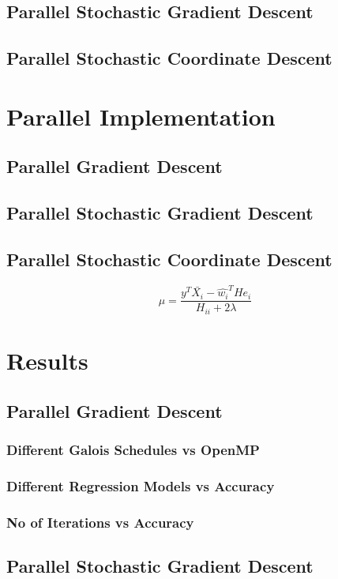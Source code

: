 \documentclass{sigplanconf}
\begin{document}
\subsection{Parallel Stochastic Gradient Descent}
\subsection{Parallel Stochastic Coordinate Descent}

\section{Parallel Implementation}
\subsection{Parallel Gradient Descent}
\subsection{Parallel Stochastic Gradient Descent}
\subsection{Parallel Stochastic Coordinate Descent}
\begin{equation} \mu = \frac{y^T \bar{X_i} - \widehat{w_i}^T H e_i }{H_{ii} + 2\lambda} \end{equation}

\section{Results}
\subsection{Parallel Gradient Descent}
\subsubsection{Different Galois Schedules vs OpenMP}
\subsubsection{Different Regression Models vs Accuracy}
\subsubsection{No of Iterations vs Accuracy}
\subsection{Parallel Stochastic Gradient Descent}
\end{document}
